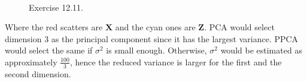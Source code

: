 \documentclass[UTF8]{ctexart}
\begin{document}
\begin{figure}[htbp]
\centering
{}
\\
\caption{Exercise 12.11.}
\end{figure}
Where the red scatters are $\textbf{X}$ and the cyan ones are $\textbf{Z}$.
PCA would select dimension 3 as the principal component since it has the largest variance.
PPCA would select the same if $\sigma^{2}$ is small enough.
Otherwise, $\sigma^{2}$ would be estimated as approximately $\frac{100}{3}$, hence the reduced variance is larger for the first and the second dimension.
\end{document}
